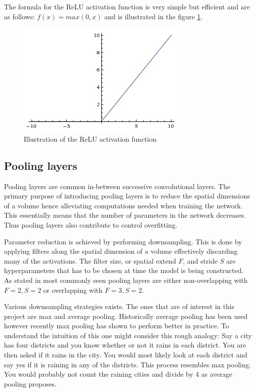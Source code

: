 The formula for the ReLU activation function is very simple but efficient and
are as follows: $f(x)=max(0,x)$ and is illustrated in the figure \ref{fig:relu}.

\begin{figure}
  \centering
  \includegraphics[scale=0.5]{Img/relu.jpeg}
  \caption{Illustration of the ReLU activation function}
  \label{fig:relu}
\end{figure}


\subsection{Pooling layers} %
\label{sub:pool_layers}

Pooling layers are common in-between successive convolutional layers. The primary purpose of introducing pooling layers is to reduce the spatial dimensions of a volume hence alleviating computations needed when training the network. This essentially means that the number of parameters in the network decreases. Thus pooling layers also contribute to control overfitting.

Parameter reduction is achieved by performing downsampling. This is done by applying filters along the spatial dimension of a volume effectively discarding many of the activations. The filter size, or spatial extend $F$, and stride $S$ are hyperparameters that has to be chosen at time the model is being constructed. As stated in \cite{cs231n} most commonly seen pooling layers are either non-overlapping with $F=2, S=2$ or overlapping with $F=3, S=2$.

Various downsampling strategies exists. The ones that are of interest in this project are max and average pooling. Historically average pooling has been used however recently max pooling has shown to perform better in practice. To understand the intuition of this one might consider this rough analogy: Say a city has four districts and you know whether or not it rains in each district. You are then asked if it rains in the city. You would most likely look at each district and say yes if it is raining in any of the districts. This process resembles max pooling. You would probably not count the raining cities and divide by 4 as average pooling proposes. 

